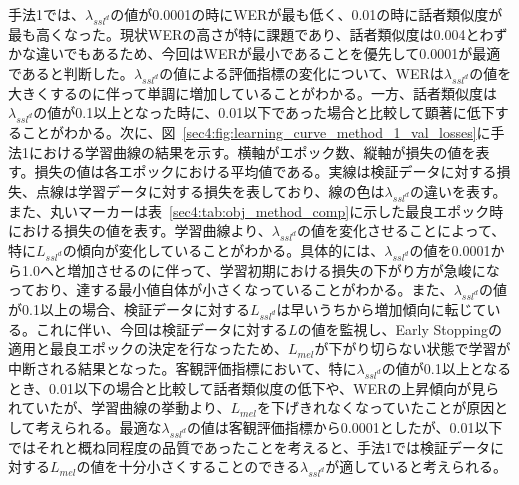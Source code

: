 \documentclass[12pt]{jarticle}
\numberwithin{equation}{section}    %
\numberwithin{figure}{section}      %
\numberwithin{table}{section}      %
\begin{document}
手法1では、$\lambda_{ssl^{d}}$の値が0.0001の時にWERが最も低く、0.01の時に話者類似度が最も高くなった。現状WERの高さが特に課題であり、話者類似度は0.004とわずかな違いでもあるため、今回はWERが最小であることを優先して0.0001が最適であると判断した。$\lambda_{ssl^{d}}$の値による評価指標の変化について、WERは$\lambda_{ssl^{d}}$の値を大きくするのに伴って単調に増加していることがわかる。一方、話者類似度は$\lambda_{ssl^{d}}$の値が0.1以上となった時に、0.01以下であった場合と比較して顕著に低下することがわかる。次に、図~\ref{sec4:fig:learning_curve_method_1_val_losses}に手法1における学習曲線の結果を示す。横軸がエポック数、縦軸が損失の値を表す。損失の値は各エポックにおける平均値である。実線は検証データに対する損失、点線は学習データに対する損失を表しており、線の色は$\lambda_{ssl^{d}}$の違いを表す。また、丸いマーカーは表~\ref{sec4:tab:obj_method_comp}に示した最良エポック時における損失の値を表す。学習曲線より、$\lambda_{ssl^{d}}$の値を変化させることによって、特に$L_{ssl^{d}}$の傾向が変化していることがわかる。具体的には、$\lambda_{ssl^{d}}$の値を0.0001から1.0へと増加させるのに伴って、学習初期における損失の下がり方が急峻になっており、達する最小値自体が小さくなっていることがわかる。また、$\lambda_{ssl^{d}}$の値が0.1以上の場合、検証データに対する$L_{ssl^{d}}$は早いうちから増加傾向に転じている。これに伴い、今回は検証データに対する$L$の値を監視し、Early Stoppingの適用と最良エポックの決定を行なったため、$L_{mel}$が下がり切らない状態で学習が中断される結果となった。客観評価指標において、特に$\lambda_{ssl^{d}}$の値が0.1以上となるとき、0.01以下の場合と比較して話者類似度の低下や、WERの上昇傾向が見られていたが、学習曲線の挙動より、$L_{mel}$を下げきれなくなっていたことが原因として考えられる。最適な$\lambda_{ssl^{d}}$の値は客観評価指標から0.0001としたが、0.01以下ではそれと概ね同程度の品質であったことを考えると、手法1では検証データに対する$L_{mel}$の値を十分小さくすることのできる$\lambda_{ssl^{d}}$が適していると考えられる。
\end{document}
